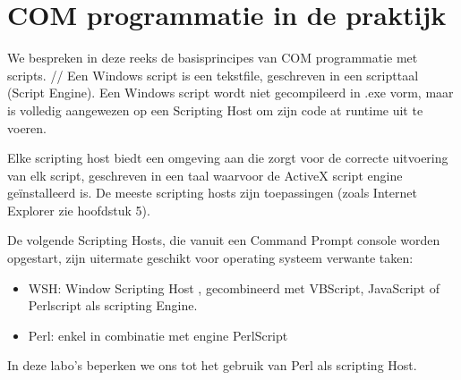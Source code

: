 \documentclass[11pt,a4paper]{report}
\begin{document}
\chapter{COM programmatie in de praktijk}
We bespreken in deze reeks de basisprincipes van COM programmatie met scripts. //
Een Windows script is een tekstfile, geschreven in een scripttaal (Script Engine). Een Windows script wordt niet gecompileerd in .exe vorm, maar is volledig aangewezen op een Scripting Host om zijn code at runtime uit te voeren.
\par Elke scripting host biedt een omgeving aan die zorgt voor de correcte uitvoering van elk script, geschreven in een taal waarvoor de ActiveX script engine geïnstalleerd is. De meeste scripting hosts zijn toepassingen (zoals Internet Explorer zie hoofdstuk 5).
\par De volgende Scripting Hosts, die vanuit een Command Prompt console worden opgestart, zijn uitermate geschikt voor operating systeem verwante taken:
\begin{itemize}
\item WSH: Window Scripting Host  , gecombineerd met VBScript, JavaScript of Perlscript als scripting Engine.
\item Perl: enkel in combinatie met engine PerlScript
\end{itemize}
In deze labo's beperken we ons tot het gebruik van Perl als scripting Host.
\end{document}
